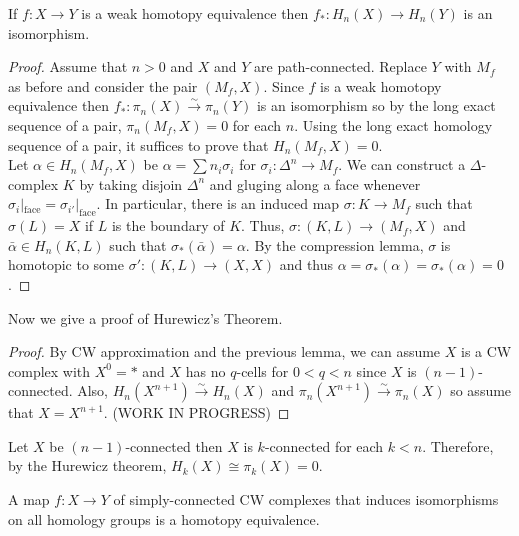 \documentclass[12pt]{extarticle}
\begin{document}
\begin{lemma}
If $f : X \to Y$ is a weak homotopy equivalence then $f_* : H_n(X) \to H_n(Y)$ is an isomorphism.
\end{lemma} 

\begin{proof}
Assume that $n > 0$ and $X$ and $Y$ are path-connected. Replace $Y$ with $M_f$ as before and consider the pair $(M_f, X)$. Since $f$ is a weak homotopy equivalence then $f_* : \pi_n(X) \xrightarrow{\sim} \pi_n(Y)$ is an isomorphism so by the long exact sequence of a pair, $\pi_n(M_f, X) = 0$ for each $n$. Using the long exact homology sequence of a pair, it suffices to prove that $H_n(M_f, X) = 0$. \bigskip\\
Let $\alpha \in H_n(M_f, X)$ be $\alpha = \sum n_i \sigma_i$ for $\sigma_i : \Delta^n \to M_f$. We can construct a $\Delta$-complex $K$ by taking disjoin $\Delta^n$ and gluging along a face whenever $\sigma_i |_{\text{face}} = \sigma_{i'} |_{\text{face}}$. In particular, there is an induced map $\sigma : K \to M_f$ such that $\sigma(L) = X$ if $L$ is the boundary of $K$. Thus, $\sigma : (K, L) \to (M_f, X)$ and $\bar{\alpha} \in H_n(K,L)$ such that $\sigma_*(\bar{\alpha}) = \alpha$. By the compression lemma, $\sigma$ is homotopic to some $\sigma' : (K, L) \to (X, X)$ and thus $\alpha = \sigma_*(\alpha) = \sigma_*(\alpha) = 0$.  
\end{proof}

Now we give a proof of Hurewicz's Theorem.

\begin{proof}
By CW approximation and the previous lemma, we can assume $X$ is a CW complex with $X^0 = \ast$ and $X$ has no $q$-cells for $0 < q < n$ since $X$ is $(n-1)$-connected. Also, $H_n(X^{n+1}) \xrightarrow{\sim} H_n(X)$ and $\pi_n(X^{n+1}) \xrightarrow{\sim} \pi_n(X)$ so assume that $X = X^{n+1}$. (WORK IN PROGRESS) 
\end{proof}

\begin{corollary}
Let $X$ be $(n-1)$-connected then $X$ is $k$-connected for each $k < n$. Therefore, by the Hurewicz theorem, $H_k(X) \cong \pi_k(X) = 0$. 
\end{corollary}

\begin{theorem}
A map $f : X \to Y$ of simply-connected CW complexes that induces isomorphisms on all homology groups is a homotopy equivalence.  
\end{theorem}
\end{document}
